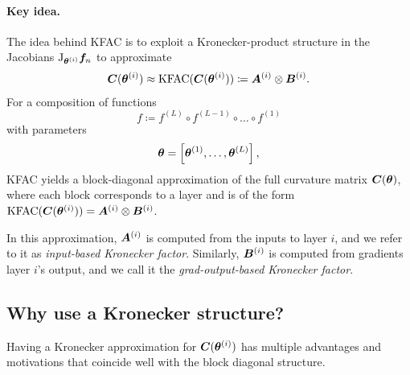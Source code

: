 \paragraph{Key idea.} The idea behind KFAC is to exploit a Kronecker-product structure in the Jacobians $\mathrm{J}_{{\bm{\theta}}^{(i)}}{\bm{f}}_n$ to approximate
\begin{align*}
  {\bm{C}}({\bm{\theta}}^{(i)})
  \approx
  \mathrm{KFAC}({\bm{C}}({\bm{\theta}}^{(i)}))
  \coloneqq {\bm{A}}^{(i)} \otimes {\bm{B}}^{(i)}.
\end{align*}
For a composition of functions $$f \coloneqq f^{(L)} \circ f^{(L-1)} \circ \dots \circ f^{(1)}$$ with parameters $${\bm{\theta}} = \left[ {\bm{\theta}}^{(1)}, \dots, {\bm{\theta}}^{(L)} \right],$$ KFAC yields a block-diagonal approximation of the full curvature matrix ${\bm{C}}({\bm{\theta}})$, where each block corresponds to a layer and is of the form $\mathrm{KFAC}({\bm{C}}({\bm{\theta}}^{(i)})) = {\bm{A}}^{{(i)}} \otimes {\bm{B}}^{(i)}$.

In this approximation, ${\bm{A}}^{(i)}$ is computed from the inputs to layer $i$, and we refer to it as \emph{input-based Kronecker factor}.
Similarly, ${\bm{B}}^{(i)}$ is computed from gradients \wrt layer $i$'s output, and we call it the \emph{grad-output-based Kronecker factor}.

\subsection{Why use a Kronecker structure?}
Having a Kronecker approximation for ${\bm{C}}({\bm{\theta}}^{(i)})$ has multiple advantages and motivations that coincide well with the block diagonal structure.

